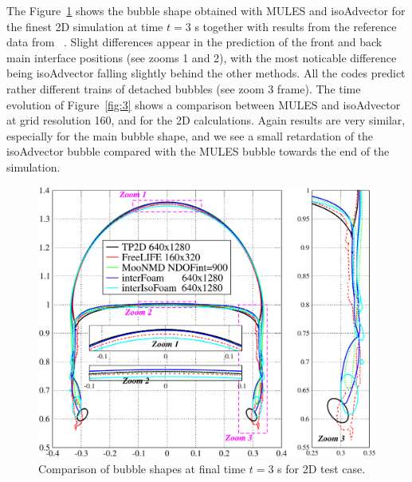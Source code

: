 \documentclass[review]{elsarticle}
\begin{document}
The Figure~\ref{fig:2} shows the bubble shape obtained with MULES and isoAdvector for the finest 2D simulation at time $t = 3$ s together with results from the reference data from ~\cite{Hysing2009}. Slight differences appear in the prediction of the front and back main interface positions (see zooms 1 and 2), with the most noticable difference being isoAdvector falling slightly behind the other methods. All the codes predict rather different trains of detached bubbles (see zoom 3 frame). The time evolution of Figure~\ref{fig:3} shows a comparison between MULES and isoAdvector at grid resolution 160, and for the 2D calculations. Again results are very similar, especially for the main bubble shape, and we see a small retardation of the isoAdvector bubble compared with the MULES bubble towards the end of the simulation.
\begin{figure}[!h]
  \includegraphics[scale=0.5]{figures/bubble_shape2D_t=3.pdf}
  \caption{Comparison of bubble shapes at final time $t=3$ s for 2D test case.}
  \label{fig:2}
\end{figure}
\end{document}
